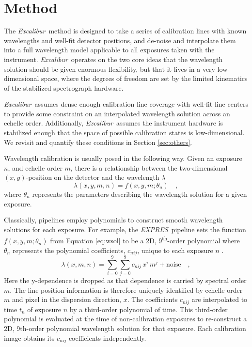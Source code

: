 \documentclass[modern]{aastex63}
\newcommand{\project}[1]{\textsl{#1}}
\newcommand{\name}{\project{Excalibur}}
\newcommand{\acronym}[1]{{\small{#1}}}
\newcommand{\expres}{\project{\acronym{EXPRES}}}
\begin{document}
\section{Method} \label{sec:method}
The \name\ method is designed to take a series of calibration lines with known wavelengths and well-fit detector positions, and de-noise and interpolate them into a full wavelength model applicable to all exposures taken with the instrument.  \name\ operates on the two core ideas that the wavelength solution should be given enormous flexibility, but that it lives in a very low-dimensional space, where the degrees of freedom are set by the limited kinematics of the stabilized spectrograph hardware.

\name\ assumes dense enough calibration line coverage with well-fit line centers to provide some constraint on an interpolated wavelength solution across an echelle order.  Additionally, \name\ assumes the instrument hardware is stabilized enough that the space of possible calibration states is low-dimensional.  We revisit and quantify these conditions in Section \ref{sec:others}.

Wavelength calibration is usually posed in the following way.  Given an exposure $n$, and echelle order $m$, there is a relationship between
the two-dimensional $(x,y)$-position on the detector and the
wavelength $\lambda$
\begin{equation}
\lambda(x,y,m,n) = f(x,y,m;\theta_{n})
\quad ,
\label{eq:wsol}
\end{equation}
where $\theta_{n}$ represents the parameters describing the wavelength solution for a given exposure.

Classically, pipelines employ polynomials to construct smooth wavelength solutions for each exposure.  For example, the \expres\ pipeline sets the function $f(x,y,m;\theta_{n})$ from Equation \ref{eq:wsol} to be a 2D, 9\textsuperscript{th}-order polynomial where $\theta_{n}$ represents the polynomial coefficients, $c_{nij}$, unique to each exposure $n$ \citep{petersburg2020}.
\begin{equation}
\lambda(x,m,n) = \sum_{i=0}^9\sum_{j=0}^9 c_{nij}\, x^i\,m^j + \mathrm{noise}
\quad ,
\label{eq:poly_wsol}
\end{equation}
Here the y-dependence is dropped as that dependence is carried by spectral order $m$.  The line position information is therefore uniquely identified by echelle order $m$ and pixel in the dispersion direction, $x$.  The coefficients $c_{nij}$ are interpolated to time $t_n$ of exposure $n$ by a third-order polynomial of time.  This third-order polynomial is evaluated at the time of non-calibration exposures to re-construct a 2D, 9th-order polynomial wavelength solution for that exposure.  Each calibration image obtains its $c_{nij}$ coefficients independently.
\end{document}
